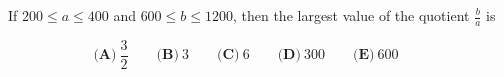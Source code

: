 

If $ 200 \le a \le 400$ and $ 600 \le b \le 1200$, then the largest value of the quotient $ \frac{b}{a}$ is

\[ \textbf{(A)}\ \frac{3}{2} \qquad
\textbf{(B)}\ 3 \qquad
\textbf{(C)}\ 6 \qquad
\textbf{(D)}\ 300 \qquad
\textbf{(E)}\ 600 \qquad
\]